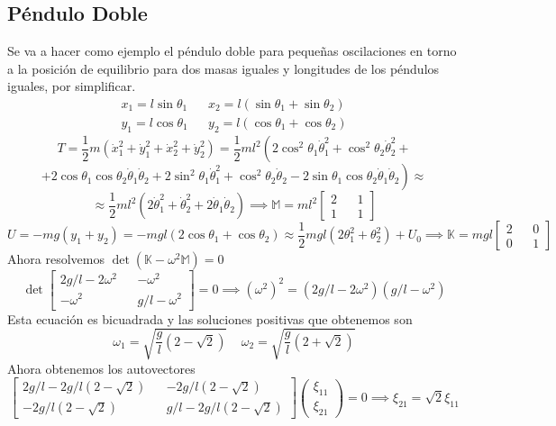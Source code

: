 \newpage
\subsection{Péndulo Doble}
Se va a hacer como ejemplo el péndulo doble para pequeñas oscilaciones en torno a la posición de equilibrio para dos masas iguales y longitudes de los péndulos iguales, por simplificar.
\[
    \begin{matrix}
        x_1 = l \sin\theta_1 && x_2 = l (\sin\theta_1 + \sin\theta_2) \\
        y_1 = l \cos\theta_1 && y_2 = l (\cos\theta_1 + \cos\theta_2)
    \end{matrix}
\]
\[
    T = \frac{1}{2} m \left(\dot{x}_1^2+\dot{y}_1^2+\dot{x}_2^2+\dot{y}_2^2\right) = \frac{1}{2} m l^2 \left(2\cos^2\theta_1 \dot{\theta}_1^2 +\cos^2\theta_2 \dot{\theta}_2^2 + \right.
\]\[
    \left.+2\cos\theta_1\cos\theta_2 \dot{\theta}_1 \dot{\theta}_2 + 2\sin^2\theta_1 \dot{\theta}_1^2 +\cos^2\theta_2 \dot{\theta}_2 - 2\sin\theta_1\cos\theta_2 \dot{\theta}_1 \dot{\theta}_2\right)  \approx  
\]\[
    \approx \frac{1}{2} m l^2 \left(2 \dot{\theta}_1^2 + \dot{\theta}_2^2 + 2 \dot{\theta}_1 \dot{\theta}_2\right) \implies \mathbb{M} = ml^2 \left[\begin{matrix}
        2 && 1 \\ 1 && 1
    \end{matrix}\right]
\]
\[U = -mg (y_1+y_2) = -mgl (2 \cos\theta_1+\cos\theta_2) \approx \frac{1}{2}mgl\left(2 \theta_1^2 + \theta_2^2\right)+ U_0 \implies \mathbb{K} = mgl \left[\begin{matrix}
    2 && 0 \\ 0 && 1
\end{matrix}\right]\]
Ahora resolvemos $\det(\mathbb{K}-\omega^2 \mathbb{M}) = 0$
\[\det\left[\begin{matrix}
    2g/l-2\omega^2 && -\omega^2 \\ -\omega^2 && g/l-\omega^2
\end{matrix}\right] = 0 \implies (\omega^2)^2=(2g/l-2\omega^2)(g/l-\omega^2)\]
Esta ecuación es bicuadrada y las soluciones positivas que obtenemos son
\[\omega_1 = \sqrt{\frac{g}{l}(2-\sqrt{2})} \ \ \ \ \ \omega_2 = \sqrt{\frac{g}{l}(2+\sqrt{2})}\]
Ahora obtenemos los autovectores
\[\left[\begin{matrix}
    2g/l-2g/l(2-\sqrt{2}) && -2g/l(2-\sqrt{2}) \\ -2g/l(2-\sqrt{2}) && g/l-2g/l(2-\sqrt{2})
\end{matrix}\right] \left(\begin{matrix}
    \xi_{11} \\ \xi_{21}
\end{matrix}\right) = 0 \implies \xi_{21} = \sqrt{2}\xi_{11}\]

